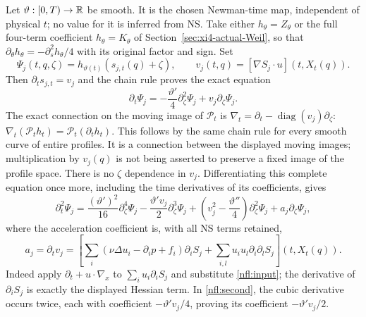 Let $\vartheta:[0,T)\to\mathbb R$ be smooth. It is the chosen Newman-time
map, independent of physical $t$; no value for it is inferred from NS.
Take either $h_\theta=Z_\theta$ or the full four-term coefficient
$h_\theta=K_\theta$ of Section~\ref{sec:xi4-actual-Weil}, so that
$\partial_\theta h_\theta=-\partial_s^2h_\theta/4$ with its original
factor and sign. Set
\[
 \Psi_j(t,q,\zeta)=h_{\vartheta(t)}(s_{j,t}(q)+\zeta),\qquad
 v_j(t,q)=[\nabla S_j\cdot u](t,X_t(q)).
\]
Then $\partial_ts_{j,t}=v_j$ and the chain rule proves the exact equation
\begin{equation}
 \partial_t\Psi_j=-\frac{\vartheta'}4\partial_\zeta^2\Psi_j
                      +v_j\partial_\zeta\Psi_j.
 \label{nfl:first}
\end{equation}
The exact connection on the moving image of $\mathcal P_t$ is
$\nabla_t=\partial_t-\operatorname{diag}(v_j)\partial_\zeta$:
$\nabla_t(\mathcal P_t h_t)=\mathcal P_t(\partial_t h_t)$.
This follows by the same chain rule for every smooth curve of entire
profiles. It is a connection between the displayed moving images;
multiplication by $v_j(q)$ is not being asserted to preserve a fixed
image of the profile space.
There is no $\zeta$ dependence in $v_j$. Differentiating this complete
equation once more, including the time derivatives of its coefficients,
gives
\begin{equation}
 \partial_t^2\Psi_j=
 \frac{(\vartheta')^2}{16}\partial_\zeta^4\Psi_j
 -\frac{\vartheta'v_j}{2}\partial_\zeta^3\Psi_j
 +\left(v_j^2-\frac{\vartheta''}{4}\right)\partial_\zeta^2\Psi_j
 +a_j\partial_\zeta\Psi_j,
 \label{nfl:second}
\end{equation}
where the acceleration coefficient is, with all NS terms retained,
\begin{equation}
 a_j=\partial_tv_j=
 \left[\sum_i(\nu\Delta u_i-\partial_i p+f_i)\partial_i S_j
             +\sum_{i,l}u_i u_l\partial_i\partial_l S_j\right](t,X_t(q)).
 \label{nfl:accel}
\end{equation}
Indeed apply $\partial_t+u\cdot\nabla_x$ to
$\sum_i u_i\partial_iS_j$ and substitute \eqref{nfl:input}; the
derivative of $\partial_iS_j$ is exactly the displayed Hessian term.
In \eqref{nfl:second}, the cubic derivative occurs twice, each with
coefficient $-\vartheta'v_j/4$, proving its coefficient $-\vartheta'v_j/2$.

